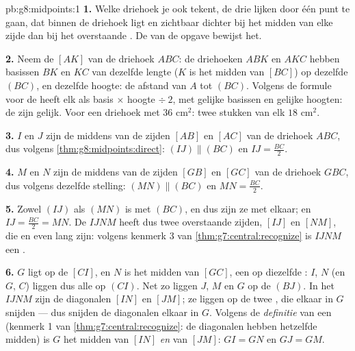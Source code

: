 \begin{solution}{pb:g8:midpoints:1}
\textbf{1.} Welke driehoek je ook tekent, de drie  lijken door één
punt te gaan, dat binnen de driehoek ligt en zichtbaar dichter bij het midden van
elke zijde dan bij het overstaande . De  van de opgave bewijst het.

\textbf{2.} Neem de  $[AK]$ van de driehoek $ABC$: de driehoeken $ABK$
en $AKC$ hebben basissen $BK$ en $KC$ van dezelfde lengte ($K$ is het midden van
$[BC]$) op dezelfde  $(BC)$, en dezelfde hoogte: de afstand van $A$ tot
$(BC)$. Volgens de formule voor de  heeft elk als 
basis $\times$ hoogte $\div\ 2$, met gelijke basissen en gelijke hoogten: de
 zijn gelijk. Voor een driehoek met  $36$ cm$^2$: twee
stukken van elk $18$ cm$^2$.

\textbf{3.} $I$ en $J$ zijn de middens van de zijden $[AB]$ en $[AC]$ van de
driehoek $ABC$, dus volgens \cref{thm:g8:midpoints:direct}:
$(IJ) \parallel (BC)$ en $IJ = \frac{BC}{2}$.

\textbf{4.} $M$ en $N$ zijn de middens van de zijden $[GB]$ en $[GC]$ van de
driehoek $GBC$, dus volgens dezelfde stelling: $(MN) \parallel (BC)$ en
$MN = \frac{BC}{2}$.

\textbf{5.} Zowel $(IJ)$ als $(MN)$ is  met $(BC)$, en dus zijn ze
 met elkaar; en $IJ = \frac{BC}{2} = MN$. De  $IJNM$ heeft dus
twee overstaande zijden, $[IJ]$ en $[NM]$, die  en even lang zijn:
volgens kenmerk 3 van \cref{thm:g7:central:recognize} is $IJNM$ een
.

\textbf{6.} $G$ ligt op de  $[CI]$, en $N$ is het midden van $[GC]$,
een  op diezelfde : $I$, $N$ (en $G$, $C$) liggen dus alle op
$(CI)$. Net zo liggen $J$, $M$ en $G$ op de  $(BJ)$. In het
 $IJNM$ zijn de diagonalen $[IN]$ en $[JM]$; ze liggen op de twee
, die elkaar in $G$ snijden --- dus snijden de diagonalen elkaar in
$G$. Volgens de \emph{definitie} van een  (kenmerk 1 van
\cref{thm:g7:central:recognize}: de diagonalen hebben hetzelfde midden) is $G$
het midden van $[IN]$ \emph{en} van $[JM]$: $GI = GN$ en $GJ = GM$.


\end{solution}
